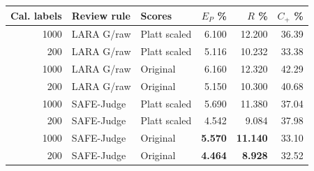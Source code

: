\begin{tabular}{@{}rllrrr@{}}
\toprule
Cal. labels & Review rule & Scores & $E_P$ \% & $R$ \% & $C_+$ \% \\
\midrule
1000 & LARA G/raw & Platt scaled & 6.100 & 12.200 & 36.39 \\
200 & LARA G/raw & Platt scaled & 5.116 & 10.232 & 33.38 \\
1000 & LARA G/raw & Original & 6.160 & 12.320 & 42.29 \\
200 & LARA G/raw & Original & 5.150 & 10.300 & 40.68 \\
1000 & SAFE-Judge & Platt scaled & 5.690 & 11.380 & 37.04 \\
200 & SAFE-Judge & Platt scaled & 4.542 & 9.084 & 37.98 \\
1000 & SAFE-Judge & Original & \textbf{5.570} & \textbf{11.140} & 33.10 \\
200 & SAFE-Judge & Original & \textbf{4.464} & \textbf{8.928} & 32.52 \\
\bottomrule
\end{tabular}
